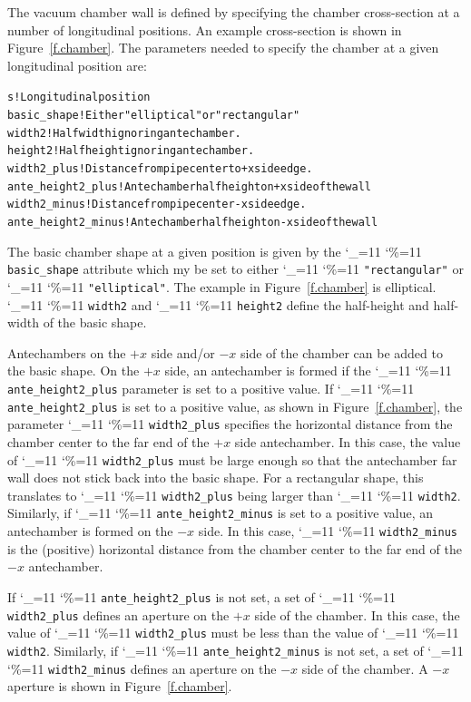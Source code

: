 \documentclass[11pt]{article}
\newcommand\ttcmd{\begingroup\catcode`\_=11 \catcode`\%=11 \dottcmd}
\newcommand\dottcmd[1]{\texttt{#1}\endgroup}
\newcommand{\fig}[1]{Figure~\ref{#1}}
\newcommand{\vn}{\ttcmd}
\newlength{\ExBeg}
\newlength{\ExEnd}
\newenvironment{example}
  {\vspace{\ExBeg} \begin{alltt}}
  {\end{alltt} \vspace{\ExEnd}}
\begin{document}
The vacuum chamber wall is defined by specifying the chamber
cross-section at a number of longitudinal positions. An example
cross-section is shown in \fig{f.chamber}. The parameters needed to
specify the chamber at a given longitudinal position are:
\begin{example}
  s                   ! Longitudinal position
  basic_shape          ! Either "elliptical" or "rectangular"
  width2              ! Half width ignoring antechamber.
  height2             ! Half height ignoring antechamber.
  width2_plus         ! Distance from pipe center to +x side edge.
  ante_height2_plus   ! Antechamber half height on +x side of the wall
  width2_minus        ! Distance from pipe center -x side edge.
  ante_height2_minus  ! Antechamber half height on -x side of the wall
\end{example}

The basic chamber shape at a given position is given by the
\vn{basic_shape} attribute which my be set to either
\vn{"rectangular"} or \vn{"elliptical"}. The example in
\fig{f.chamber} is elliptical. \vn{width2} and \vn{height2} define the
half-height and half-width of the basic shape. 

Antechambers on the $+x$ side and/or $-x$ side of the chamber can be
added to the basic shape. On the $+x$ side, an antechamber is formed
if the \vn{ante_height2_plus} parameter is set to a positive value. If
\vn{ante_height2_plus} is set to a positive value, as shown in
\fig{f.chamber}, the parameter \vn{width2_plus} specifies the
horizontal distance from the chamber center to the far end of the $+x$
side antechamber. In this case, the value of \vn{width2_plus} must be
large enough so that the antechamber far wall does not stick back into
the basic shape. For a rectangular shape, this translates to
\vn{width2_plus} being larger than \vn{width2}. Similarly, if
\vn{ante_height2_minus} is set to a positive value, an antechamber is
formed on the $-x$ side.  In this case, \vn{width2_minus} is the
(positive) horizontal distance from the chamber center to the far end
of the $-x$ antechamber.

If \vn{ante_height2_plus} is not set, a set of \vn{width2_plus}
defines an aperture on the $+x$ side of the chamber. In this case, the
value of \vn{width2_plus} must be less than the value of
\vn{width2}. Similarly, if \vn{ante_height2_minus} is not set, a set of
\vn{width2_minus} defines an aperture on the $-x$ side of the chamber.
A $-x$ aperture is shown in \fig{f.chamber}.
\end{document}
